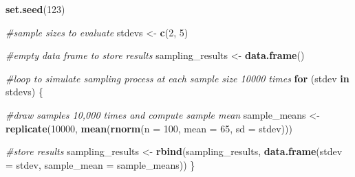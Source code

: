 \documentclass[
]{book}
\newenvironment{Shaded}{\begin{snugshade}}{\end{snugshade}}
\newcommand{\AttributeTok}[1]{\textcolor[rgb]{0.13,0.29,0.53}{#1}}
\newcommand{\CommentTok}[1]{\textcolor[rgb]{0.56,0.35,0.01}{\textit{#1}}}
\newcommand{\ControlFlowTok}[1]{\textcolor[rgb]{0.13,0.29,0.53}{\textbf{#1}}}
\newcommand{\DecValTok}[1]{\textcolor[rgb]{0.00,0.00,0.81}{#1}}
\newcommand{\FunctionTok}[1]{\textcolor[rgb]{0.13,0.29,0.53}{\textbf{#1}}}
\newcommand{\NormalTok}[1]{#1}
\newcommand{\OtherTok}[1]{\textcolor[rgb]{0.56,0.35,0.01}{#1}}
\begin{document}
\begin{Shaded}
\begin{Highlighting}[]
\FunctionTok{set.seed}\NormalTok{(}\DecValTok{123}\NormalTok{)}

\CommentTok{\#sample sizes to evaluate}
\NormalTok{stdevs }\OtherTok{\textless{}{-}} \FunctionTok{c}\NormalTok{(}\DecValTok{2}\NormalTok{, }\DecValTok{5}\NormalTok{) }

\CommentTok{\#empty data frame to store results}
\NormalTok{sampling\_results }\OtherTok{\textless{}{-}} \FunctionTok{data.frame}\NormalTok{()}

\CommentTok{\#loop to simulate sampling process at each sample size 10000 times}
\ControlFlowTok{for}\NormalTok{ (stdev }\ControlFlowTok{in}\NormalTok{ stdevs) \{}
  
  \CommentTok{\#draw samples 10,000 times and compute sample mean}
\NormalTok{  sample\_means }\OtherTok{\textless{}{-}} \FunctionTok{replicate}\NormalTok{(}\DecValTok{10000}\NormalTok{, }\FunctionTok{mean}\NormalTok{(}\FunctionTok{rnorm}\NormalTok{(}\AttributeTok{n =} \DecValTok{100}\NormalTok{, }\AttributeTok{mean =} \DecValTok{65}\NormalTok{, }\AttributeTok{sd =}\NormalTok{ stdev)))}
  
  \CommentTok{\#store results}
\NormalTok{  sampling\_results }\OtherTok{\textless{}{-}} \FunctionTok{rbind}\NormalTok{(sampling\_results, }
                            \FunctionTok{data.frame}\NormalTok{(}\AttributeTok{stdev =}\NormalTok{ stdev, }
                                       \AttributeTok{sample\_mean =}\NormalTok{ sample\_means))}
\NormalTok{\}}


\end{Highlighting}
\end{Shaded}
\end{document}
